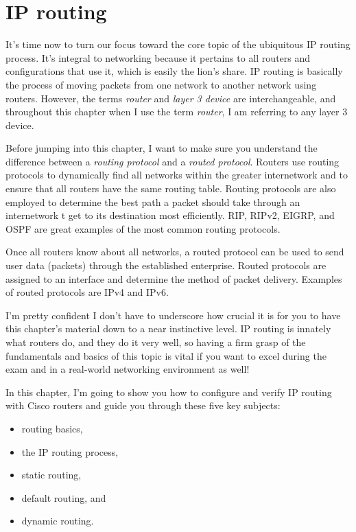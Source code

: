 \chapter{IP routing}
\label{chap:ip-routing}

It's time now to turn our focus toward the core topic of the ubiquitous IP routing process.
It's integral to networking because it pertains to all routers and configurations that use it, which is easily the lion's share.
IP routing is basically the process of moving packets from one network to another network using routers.
However, the terms \emph{router} and \emph{layer 3 device} are interchangeable, and throughout this chapter when I use the term \emph{router},
I am referring to any layer 3 device.

Before jumping into this chapter, I want to make sure you understand the difference between a \emph{routing protocol} and a \emph{routed protocol}.
Routers use routing protocols to dynamically find all networks within the greater internetwork and to ensure that all routers have the same routing table.
Routing protocols are also employed to determine the best path a packet should take through an internetwork t get to its destination most efficiently.
RIP, RIPv2, EIGRP, and OSPF are great examples of the most common routing protocols.

Once all routers know about all networks, a routed protocol can be used to send user data (packets) through the established enterprise.
Routed protocols are assigned to an interface and determine the method of packet delivery.
Examples of routed protocols are IPv4 and IPv6.

I'm pretty confident I don't have to underscore how crucial it is for you to have this chapter's material down to a near instinctive level.
IP routing is innately what routers do, and they do it very well,
so having a firm grasp of the fundamentals and basics of this topic is vital if you want to excel during the exam and in a real-world networking environment as well!

In this chapter, I'm going to show you how to configure and verify IP routing with Cisco routers and guide you through these five key subjects:
\begin{itemize}
\item routing basics,
\item the IP routing process,
\item static routing,
\item default routing, and
\item dynamic routing.
\end{itemize}

